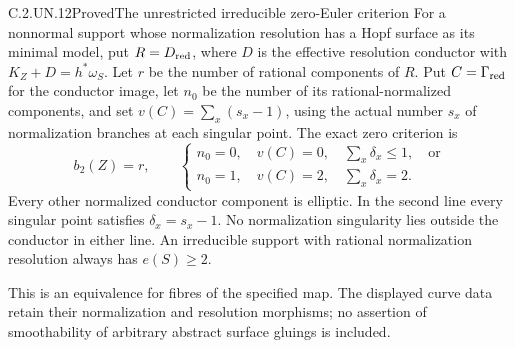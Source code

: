 \begin{statement}{C.2.UN.12}{Proved}{The unrestricted irreducible zero-Euler criterion}
For a nonnormal support whose normalization resolution
has a Hopf surface as its minimal model, put $R=D_{\rm red}$,
where $D$ is the effective
resolution conductor with $K_Z+D=h^*\omega_S$. Let $r$ be
the number of rational components of $R$. Put
$C=\Gamma_{\rm red}$ for the conductor image, let $n_0$ be
the number of its rational-normalized components, and set
$v(C)=\sum_x(s_x-1)$, using the actual number $s_x$ of
normalization branches at each singular point. The exact
zero criterion is
\[
 b_2(Z)=r,\qquad
 \begin{cases}
 n_0=0,\quad v(C)=0,\quad\sum_x\delta_x\le1,\quad\text{or}\\
 n_0=1,\quad v(C)=2,\quad\sum_x\delta_x=2.
 \end{cases}                                                   \tag{C.IZ.2}
\]
Every other normalized conductor component is elliptic.
In the second line every singular point satisfies
$\delta_x=s_x-1$. No normalization singularity lies outside
the conductor in either line. An irreducible support with
rational normalization resolution always has $e(S)\ge2$.

This is an equivalence for fibres of the specified map.
The displayed curve data retain their normalization and
resolution morphisms; no assertion of smoothability of
arbitrary abstract surface gluings is included.
\end{statement}
